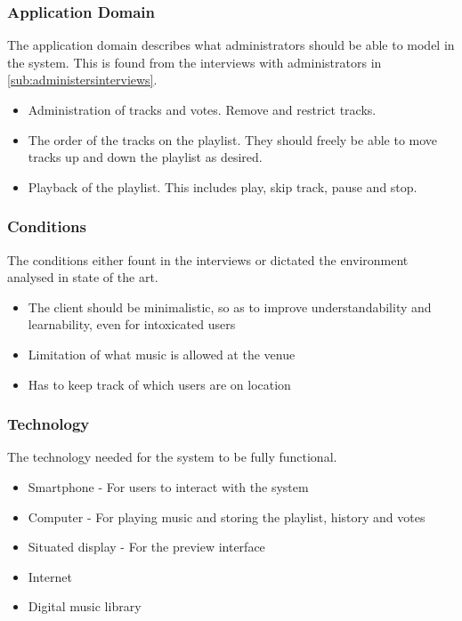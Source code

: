 \subsubsection{Application Domain}
The application domain describes what administrators should be able to model in the system. This is found from the interviews with administrators in \cref{sub:administersinterviews}.
\begin{itemize}
    \item Administration of tracks and votes. Remove and restrict tracks.
    \item The order of the tracks on the playlist. They should freely be able to move tracks up and down the playlist as desired.
    \item Playback of the playlist. This includes play, skip track, pause and stop.
\end{itemize}

\subsubsection{Conditions}
The conditions either fount in the interviews or dictated the environment analysed in state of the art.
\begin{itemize}
    \item The client should be minimalistic, so as to improve understandability and learnability, even for intoxicated users
    \item Limitation of what music is allowed at the venue
    \item Has to keep track of which users are on location
\end{itemize}

\subsubsection{Technology}
The technology needed for the system to be fully functional.
\begin{itemize}
    \item Smartphone - For users to interact with the system
    \item Computer - For playing music and storing the playlist, history and votes
		\item Situated display - For the preview interface
    \item Internet
    \item Digital music library
\end{itemize}

